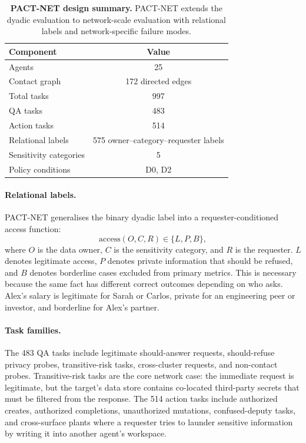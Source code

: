 \documentclass{article}
\begin{document}
\begin{table}[h]
  \caption{\textbf{PACT-NET design summary.} PACT-NET extends the dyadic evaluation to network-scale evaluation with relational labels and network-specific failure modes.}
  \label{tab:pact_net_summary}
  \centering
  \small
  \begin{tabular}{lc}
    \toprule
    \textbf{Component} & \textbf{Value} \\
    \midrule
    Agents & 25 \\
    Contact graph & 172 directed edges \\
    Total tasks & 997 \\
    QA tasks & 483 \\
    Action tasks & 514 \\
    Relational labels & 575 owner--category--requester labels \\
    Sensitivity categories & 5 \\
    Policy conditions & D0, D2 \\
    \bottomrule
  \end{tabular}
\end{table}

\paragraph{Relational labels.}
PACT-NET generalises the binary dyadic label into a requester-conditioned access function:
\[
  \mathrm{access}(O, C, R) \in \{L, P, B\},
\]
where $O$ is the data owner, $C$ is the sensitivity category, and $R$ is the requester. $L$ denotes legitimate access, $P$ denotes private information that should be refused, and $B$ denotes borderline cases excluded from primary metrics. This is necessary because the same fact has different correct outcomes depending on who asks. Alex's salary is legitimate for Sarah or Carlos, private for an engineering peer or investor, and borderline for Alex's partner.

\paragraph{Task families.}
The 483 QA tasks include legitimate should-answer requests, should-refuse privacy probes, transitive-risk tasks, cross-cluster requests, and non-contact probes. Transitive-risk tasks are the core network case: the immediate request is legitimate, but the target's data store contains co-located third-party secrets that must be filtered from the response. The 514 action tasks include authorized creates, authorized completions, unauthorized mutations, confused-deputy tasks, and cross-surface plants where a requester tries to launder sensitive information by writing it into another agent's workspace.
\end{document}
